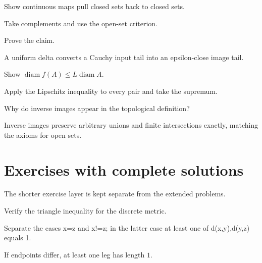\begin{problem}\label{prob:ii05-problem-09}
Show continuous maps pull closed sets back to closed sets.
\end{problem}
\begin{solution}
Take complements and use the open-set criterion.
\end{solution}

\begin{problem}\label{prob:ii05-problem-10}
Prove the claim.
\end{problem}
\begin{solution}
A uniform delta converts a Cauchy input tail into an epsilon-close image tail.
\end{solution}

\begin{problem}\label{prob:ii05-problem-11}
Show $\operatorname{diam}f(A)\le L\operatorname{diam}A$.
\end{problem}
\begin{solution}
Apply the Lipschitz inequality to every pair and take the supremum.
\end{solution}

\begin{problem}\label{prob:ii05-problem-12}
Why do inverse images appear in the topological definition?
\end{problem}
\begin{solution}
Inverse images preserve arbitrary unions and finite intersections exactly, matching the axioms for open sets.
\end{solution}

\section{Exercises with complete solutions}
The shorter exercise layer is kept separate from the extended problems.

\begin{exercise}\label{exr:ii05-01}
Verify the triangle inequality for the discrete metric.
\end{exercise}
\begin{hint}
Separate the cases x=z and x!=z; in the latter case at least one of d(x,y),d(y,z) equals 1.
\end{hint}
\begin{solution}
If endpoints differ, at least one leg has length $1$.
\end{solution}

